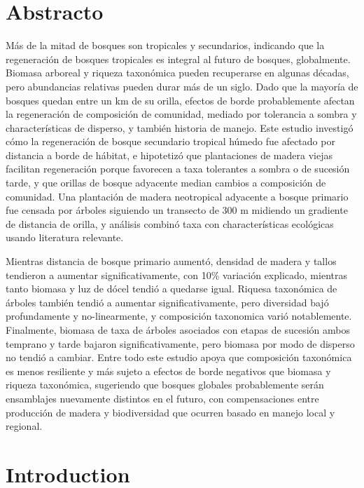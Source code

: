 \documentclass[
  12pt,
]{article}
\begin{document}
\newpage

\hypertarget{abstracto}{%
\section*{Abstracto}\label{abstracto}}

Más de la mitad de bosques son tropicales y secundarios, indicando que la regeneración de bosques tropicales es integral al futuro de bosques, globalmente.
Biomasa arboreal y riqueza taxonómica pueden recuperarse en algunas décadas, pero abundancias relativas pueden durar más de un siglo.
Dado que la mayoría de bosques quedan entre un km de su orilla, efectos de borde probablemente afectan la regeneración de composición de comunidad, mediado por tolerancia a sombra y characterísticas de disperso, y también historia de manejo.
Este estudio investigó cómo la regeneración de bosque secundario tropical húmedo fue afectado por distancia a borde de hábitat, e hipotetizó que plantaciones de madera viejas facilitan regeneración porque favorecen a taxa tolerantes a sombra o de sucesión tarde, y que orillas de bosque adyacente median cambios a composición de comunidad.
Una plantación de madera neotropical adyacente a bosque primario fue censada por árboles siguiendo un transecto de 300 m midiendo un gradiente de distancia de orilla, y análisis combinó taxa con characterísticas ecológicas usando literatura relevante.

Mientras distancia de bosque primario aumentó, densidad de madera y tallos tendieron a aumentar significativamente, con 10\% variación explicado, mientras tanto biomasa y luz de dócel tendió a quedarse igual.
Riquesa taxonómica de árboles también tendió a aumentar significativamente, pero diversidad bajó profundamente y no-linearmente, y composición taxonomica varió notablemente.
Finalmente, biomasa de taxa de árboles asociados con etapas de sucesión ambos temprano y tarde bajaron significativamente, pero biomasa por modo de disperso no tendió a cambiar.
Entre todo este estudio apoya que composición taxonómica es menos resiliente y más sujeto a efectos de borde negativos que biomasa y riqueza taxonómica, sugeriendo que bosques globales probablemente serán ensamblajes nuevamente distintos en el futuro, con compensaciones entre producción de madera y biodiversidad que ocurren basado en manejo local y regional.

\newpage

\hypertarget{introduction}{%
\section{Introduction}\label{introduction}}
\end{document}
